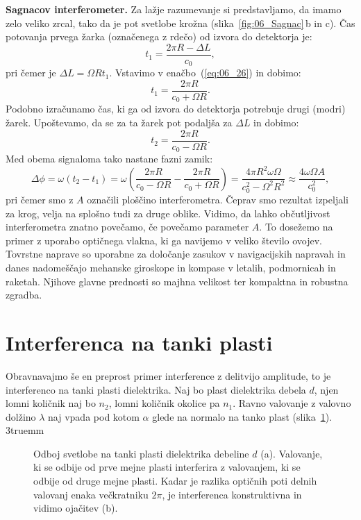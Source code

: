 \begin{example}{\bf Sagnacov interferometer.}
Za lažje razumevanje si predstavljamo, da imamo zelo veliko zrcal, 
tako da je pot svetlobe krožna (slika~\ref{fig:06_Sagnac}\,b in c).
Čas potovanja prvega žarka (označenega z rdečo) od izvora do detektorja je:
\begin{equation}
t_1 = \frac{2\pi R- \Delta L}{c_0},
\label{eq:06_26}
\end{equation}
pri čemer je $\Delta L  = \Omega R t_1$. Vstavimo v enačbo~(\ref{eq:06_26}) 
in dobimo:
\begin{equation}
t_1 = \frac{2\pi R}{c_0+\Omega R}.
\label{eq:06_27}
\end{equation}
Podobno izračunamo čas, ki ga od izvora do detektorja potrebuje drugi (modri) žarek. 
Upoštevamo, da se za ta žarek pot podaljša za $\Delta L$ in dobimo:
\begin{equation}
t_2 = \frac{2 \pi R}{c_0 -\Omega R}.
\label{eq:06_28}
\end{equation}
Med obema signaloma tako nastane fazni zamik:
\begin{equation}
\Delta \phi = \omega (t_2 -t_1) = \omega \left(\frac{2\pi R}{c_0-\Omega R} - 
\frac{2 \pi R}{c_0 + \Omega R}\right) = 
\frac{4 \pi R^2 \omega \Omega}{c_0^2 - \Omega^2R^2} \approx 
\frac{4 \omega \Omega A}{c_0^2},
\label{eq:06_29}
\end{equation}
pri čemer smo z $A$ označili ploščino interferometra. Čeprav smo rezultat izpeljali za
krog, velja na splošno tudi za druge oblike. Vidimo, da lahko 
občutljivost interferometra znatno povečamo, če povečamo parameter $A$. 
To dosežemo na primer z uporabo optičnega vlakna, ki ga navijemo v veliko 
število ovojev. Tovrstne naprave so uporabne za določanje zasukov v navigacijskih 
napravah in danes nadomeščajo mehanske giroskope in kompase v letalih,
podmornicah in raketah. Njihove glavne prednosti so majhna velikost ter
kompaktna in robustna zgradba. 
\end{example}

\section{Interferenca na tanki plasti}
Obravnavajmo še en preprost primer interference z delitvijo amplitude, to je 
interferenco na tanki plasti dielektrika. Naj bo plast dielektrika
debela $d$, njen lomni količnik naj bo $n_2$, lomni količnik okolice
pa $n_1$. Ravno valovanje z valovno dolžino $\lambda$ naj vpada pod kotom
$\alpha$ glede na normalo na tanko plast (slika~\ref{fig:06_plast}).
\vglue3truemm
\begin{figure}[ht]
\centering
\def\svgwidth{130truemm} 

\caption{Odboj svetlobe na tanki plasti dielektrika debeline $d$ (a). Valovanje,
ki se odbije od prve mejne plasti interferira z valovanjem, ki se odbije od 
druge mejne plasti.
Kadar je razlika optičnih poti delnih valovanj enaka večkratniku $2\pi$,
je interferenca konstruktivna in vidimo ojačitev (b). 
}
\label{fig:06_plast}
\end{figure}

